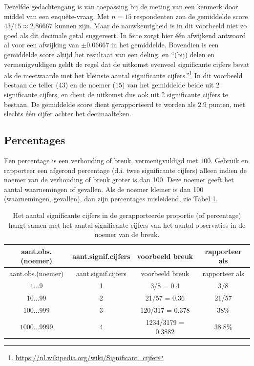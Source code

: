 \documentclass[
]{book}
\begin{document}
Dezelfde gedachtengang is van toepassing bij de meting van een kenmerk
door middel van een enquête-vraag. Met \(n=15\) respondenten zou de
gemiddelde score \(43/15 \approx 2.86667\) kunnen zijn. Maar de
nauwkeurigheid is in dit voorbeeld niet zo goed als dit decimale getal
suggereert. In feite zorgt hier één afwijkend antwoord al voor een
afwijking van \(\pm0.06667\) in het gemiddelde. Bovendien is een
gemiddelde score altijd het resultaat van een deling, en ``(bij) delen
en vermenigvuldigen geldt de regel dat de uitkomst evenveel significante
cijfers bevat als de meetwaarde met het kleinste aantal significante
cijfers.''\footnote{\url{https://nl.wikipedia.org/wiki/Significant_cijfer}} In dit voorbeeld bestaan de teller (\(43\)) en de noemer
(\(15\)) van het gemiddelde beide uit 2 significante cijfers, en dient de
uitkomst dus ook uit 2 significante cijfers te bestaan. De gemiddelde
score dient gerapporteerd te worden als \(2.9\) punten, met slechts één
cijfer achter het decimaalteken.

\subsection{Percentages}\label{percentages}

Een percentage is een verhouding of breuk, vermenigvuldigd met \(100\).
Gebruik en rapporteer een afgerond percentage (d.i. twee significante
cijfers) alleen indien de noemer van de verhouding of breuk groter is
dan 100. Deze noemer geeft het aantal waarnemingen of gevallen. Als de
noemer kleiner is dan 100 (waarnemingen, gevallen), dan zijn percentages
misleidend, zie Tabel \ref{tab:signifcijferspercentage}.

\begin{longtable}[]{@{}cccc@{}}
\caption{\label{tab:signifcijferspercentage} Het aantal significante cijfers in de gerapporteerde proportie (of percentage) hangt samen met het aantal significante cijfers van het aantal observaties in de noemer van de breuk.}\tabularnewline
\toprule\noalign{}
aant.obs.(noemer) & aant.signif.cijfers & voorbeeld breuk & rapporteer als \\
\midrule\noalign{}
\endfirsthead
\toprule\noalign{}
aant.obs.(noemer) & aant.signif.cijfers & voorbeeld breuk & rapporteer als \\
\midrule\noalign{}
\endhead
\bottomrule\noalign{}
\endlastfoot
\(1\dots9\) & 1 & 3/8 = 0.4 & 3/8 \\
\(10\dots99\) & 2 & 21/57 = 0.36 & 21/57 \\
\(100\dots999\) & 3 & 120/317 = 0.378 & 38\% \\
\(1000\dots9999\) & 4 & 1234/3179 = 0.3882 & 38.8\% \\
\end{longtable}
\end{document}

